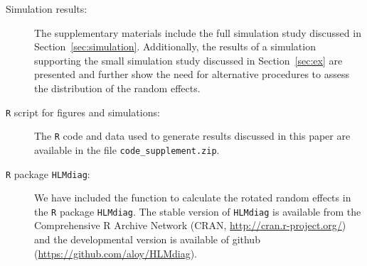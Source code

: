 \documentclass[12pt]{article} %
\begin{document}
\begin{description}
\item[Simulation results:] The supplementary materials include the full simulation study discussed in Section~\ref{sec:simulation}. Additionally, the results of a simulation supporting the small simulation study discussed in Section~\ref{sec:ex} are presented and further show the need for alternative procedures to assess the distribution of the random effects.

\item[\texttt{R} script for figures and simulations:] The \texttt{R} code and data used to generate results discussed in this paper are available in the file \texttt{code\_supplement.zip}. 

\item[\texttt{R} package \texttt{HLMdiag}:] We have included the function to calculate the rotated random effects in the \texttt{R} package \texttt{HLMdiag}. The stable version of \texttt{HLMdiag} is available from the Comprehensive R Archive Network (CRAN, \url{http://cran.r-project.org/}) and the developmental version is available of github (\url{https://github.com/aloy/HLMdiag}).
\end{description}



\end{document}
